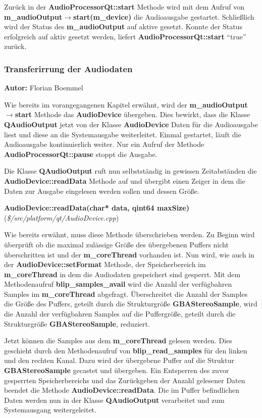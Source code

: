 \documentclass[11pt,a4paper]{scrartcl}
\newcommand{\AutorFlorian} {
    \vspace{-4mm}
    \large \textbf{Autor:} Florian Boemmel \normalsize
    \vspace{2mm}
}
\newcommand{\paratitlecode}[2] {
    \vspace{5mm}
    \large \textbf{#1} \normalsize(\textit{\${#2}})
    \vspace{2mm}\newline
}
\begin{document}
Zur\"uck in der \textbf{AudioProcessorQt::start} Methode wird mit dem Aufruf von \textbf{m\_audioOutput$\rightarrow$start(m\_device)} die Audioausgabe gestartet. Schlie{\ss}lich wird der Status des \textbf{m\_audioOutput} auf aktive gesetzt.
Konnte der Status erfolgreich auf aktiv gesetzt werden, liefert \textbf{AudioProcessorQt::start} \enquote{true} zur\"uck.
 
\subsubsection{Transferirrung der Audiodaten}
\AutorFlorian

Wie bereits im vorangegangenen Kapitel erw\"ahnt, wird der \textbf{m\_audioOutput$\rightarrow$start} Methode das \textbf{AudioDevice} \"ubergeben. Dies bewirkt, dass die Klasse \textbf{QAudioOutput} jetzt von der Klasse \textbf{AudioDevice} 
Daten f\"ur die Audioausgabe liest und diese an die Systemausgabe weiterleitet. Einmal gestartet, l\"auft die Audioausgabe kontinuierlich weiter. Nur ein Aufruf der Methode \textbf{AudioProcessorQt::pause} stoppt die Ausgabe.

Die Klasse \textbf{QAudioOutput} ruft nun selbstst\"andig  in gewissen Zeitabst\"anden die \textbf{AudioDevice::readData} Methode auf und \"ubergibt einen Zeiger in dem die Daten zur Ausgabe eingelesen werden sollen und dessen Gr\"o{\ss}e.


\paratitlecode{AudioDevice::readData(char* data, qint64 maxSize)}{/src/platform/qt/AudioDevice.cpp}
Wie bereits erw\"ahnt, muss diese Methode \"uberschrieben werden. Zu Beginn wird \"uberpr\"uft ob die maximal zul\"assige Gr\"o{\ss}e des \"ubergebenen Puffers nicht \"uberschritten ist und der \textbf{m\_coreThread} vorhanden ist.
Nun wird, wie auch in der \textbf{AudioDevice::setFormat} Methode, der Speicherbereich im \textbf{m\_coreThread} in dem die Audiodaten gespeichert sind gesperrt.
Mit dem Methodenaufruf \textbf{blip\_samples\_avail} wird die Anzahl der verf\"ugbahren Samples im \textbf{m\_coreThread} abgefragt. \"Uberschreitet die Anzahl der Samples die Gr\"o{\ss}e des Puffers, geteilt durch die 
Strukturgr\"o{\ss}e \textbf{GBAStereoSample}, wird die Anzahl der verf\"ugbahren Samples auf die Puffergr\"o{\ss}e, geteilt durch die Strukturgr\"o{\ss}e \textbf{GBAStereoSample}, reduziert.

Jetzt k\"onnen die Samples aus dem \textbf{m\_coreThread} gelesen werden. Dies geschieht durch den Methodenaufruf von \textbf{blip\_read\_samples} f\"ur den linken und den rechten Kanal. 
Dazu wird der \"ubergebene Puffer auf die Struktur \textbf{GBAStereoSample} gecastet und \"ubergeben. Ein Entsperren des zuvor gesperrten Speicherbereichs und das Zur\"uckgeben der Anzahl gelesener Daten beendet die Methode
\textbf{AudioDevice::readData}. Die im Puffer befindlichen Daten werden nun in der Klasse \textbf{QAudioOutput} verarbeitet und zum Systemausgang weitergeleitet.
\end{document}
